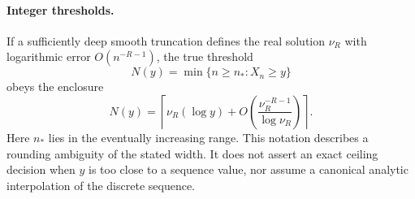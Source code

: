 \documentclass[11pt]{article}
\begin{document}
\paragraph{Integer thresholds.}
If a sufficiently deep smooth truncation defines the real solution $\nu_R$ with logarithmic error $O(n^{-R-1})$, the true threshold
\[
 N(y)=\min\{n\ge n_*:X_n\ge y\}
\]
obeys the enclosure
\begin{equation}\label{fss:eq:ceil}
 N(y)=\left\lceil\nu_R(\log y)
 +O\!\left(\frac{\nu_R^{-R-1}}{\log\nu_R}\right)\right\rceil.
\end{equation}
Here $n_*$ lies in the eventually increasing range. This notation describes a rounding ambiguity of the stated width. It does not assert an exact ceiling decision when $y$ is too close to a sequence value, nor assume a canonical analytic interpolation of the discrete sequence.
\end{document}
